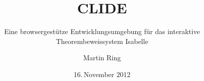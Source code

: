 \makeatletter


\author{Martin Ring}

\title{CLIDE}
\subtitle{Eine browsergestütze Entwicklungsumgebung für das interaktive Theorembeweissystem Isabelle}

\date{16.\,November 2012}





\onehalfspacing

\makeatother
\endinput
